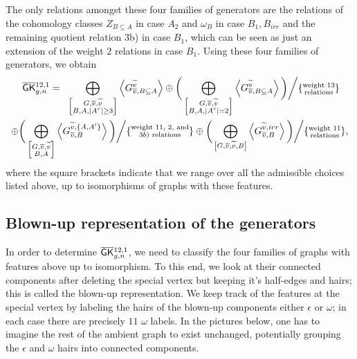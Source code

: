 The only relations amongst these four families of generators are the relations of the cohomology classes $Z_{B\subseteq A}$ in case $A_2$ and $\omega_B$ in case $B_1,B_{irr}$ and the remaining quotient relation 3b) in case $B_1$, which can be seen as just an extension of the weight $2$ relations in case $B_1$. Using these four families of generators, we obtain
\begin{multline}
    \; \overline{\mathsf{GK}}{}^{12,1}_{g,n} = \;\;
    \bigoplus_{\left[\substack{G,\overline{v},\widetilde{v} \\ B,A,|A^c|\geq 3} \right]} \left< G_{\overline{v},B\subseteq A}^{\widetilde{v}} \right>
    \oplus \bigg( \bigoplus_{\left[\substack{G,\overline{v},\widetilde{v} \\ B,A,|A^c|=2 }\right]} \left< G_{\overline{v},B\subseteq A}^{\widetilde{v}} \right> \bigg) \bigg/ \{\substack{\text{weight 13}\\ \text{relations}}\} \\
    \oplus \bigg( \bigoplus_{\left[\substack{G,\overline{v},\widetilde{v} \\ B, A}\right]} \left<G_{\overline{v},B}^{\widetilde{v},\{A,A'\}} \right> \bigg) \bigg/ \{\substack{\text{weight 11, 2, and}\\ \text{$3b)$ relations}}\}
    \oplus \bigg( \bigoplus_{\left[G,\overline{v},\widetilde{v},B\right]} \left< G_{\overline{v},B}^{\widetilde{v},irr} \right> \bigg) \bigg/ \{\substack{\text{weight 11}\\ \text{relations}}\},
\end{multline}
where the square brackets indicate that we range over all the admissible choices listed above, up to isomorphisms of graphs with these features.


\subsection{Blown-up representation of the generators}
In order to determine $\overline{\mathsf{GK}}{}_{g,n}^{12,1}$, we need to classify the four families of graphs with features above up to isomorphism. To this end, we look at their connected components after deleting the special vertex but keeping it's half-edges and hairs; this is called the blown-up representation. We keep track of the features at the special vertex by labeling the hairs of the blown-up components either $\epsilon$ or $\omega$; in each case there are precisely $11$ $\omega$ labels. In the pictures below, one has to imagine  the rest of the ambient graph to exist unchanged, potentially grouping the $\epsilon$ and $\omega$ hairs into connected components.

